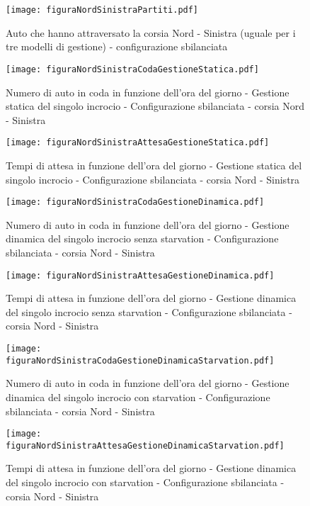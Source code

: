 \newpage
\begin{figure}[H]
\centering
  \texttt{[image: figuraNordSinistraPartiti.pdf]}
  \caption{Auto che hanno attraversato la corsia Nord - Sinistra (uguale per i tre modelli di gestione) - configurazione sbilanciata}
  \label{fig:partitiMuSbil}
\end{figure}
\begin{figure}[H]
\centering
  \texttt{[image: figuraNordSinistraCodaGestioneStatica.pdf]}
  \caption{Numero di auto in coda in funzione dell'ora del giorno - Gestione statica del singolo incrocio - Configurazione sbilanciata - corsia Nord - Sinistra}
  \label{fig:}
\end{figure}

\newpage

\begin{figure}[H]
\centering
  \texttt{[image: figuraNordSinistraAttesaGestioneStatica.pdf]}
  \caption{Tempi di attesa in funzione dell'ora del giorno - Gestione statica del singolo incrocio - Configurazione sbilanciata - corsia Nord - Sinistra}
  \label{fig:}
\end{figure}
\begin{figure}[H]
\centering
  \texttt{[image: figuraNordSinistraCodaGestioneDinamica.pdf]}
  \caption{Numero di auto in coda in funzione dell'ora del giorno - Gestione dinamica del singolo incrocio senza starvation - Configurazione sbilanciata - corsia Nord - Sinistra}
  \label{fig:}
\end{figure}

\newpage

\begin{figure}[H]
\centering
  \texttt{[image: figuraNordSinistraAttesaGestioneDinamica.pdf]}
  \caption{Tempi di attesa in funzione dell'ora del giorno - Gestione dinamica del singolo incrocio senza starvation - Configurazione sbilanciata - corsia Nord - Sinistra}
  \label{fig:}
\end{figure}
\begin{figure}[H]
\centering
  \texttt{[image: figuraNordSinistraCodaGestioneDinamicaStarvation.pdf]}
  \caption{Numero di auto in coda in funzione dell'ora del giorno - Gestione dinamica del singolo incrocio con starvation - Configurazione sbilanciata - corsia Nord - Sinistra}
  \label{fig:}
\end{figure}
\newpage
\begin{figure}[H]
\centering
  \texttt{[image: figuraNordSinistraAttesaGestioneDinamicaStarvation.pdf]}
  \caption{Tempi di attesa in funzione dell'ora del giorno - Gestione dinamica del singolo incrocio con starvation - Configurazione sbilanciata - corsia Nord - Sinistra}
  \label{fig:}
\end{figure}

